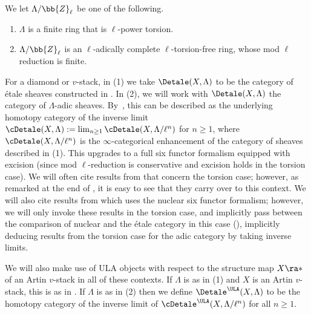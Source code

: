 \documentclass[letterpaper,11pt]{amsart}
\begin{document}
\begin{itemize}
\begin{setup}{\label{assumption: coefficientsystemsingeneral}}
We let $\Lambda/\bb{Z}_{\ell}$ be one of the following.
\begin{enumerate}
\item $\Lambda$ is a finite ring that is $\ell$-power torsion.
\item  $\Lambda/\bb{Z}_{\ell}$ is an $\ell$-adically complete $\ell$-torsion-free ring, whose mod $\ell$ reduction is finite.
\end{enumerate}
\end{setup}
For a diamond or $v$-stack, in (1) we take $\Detale(X,\Lambda)$ to be the category of \'etale sheaves constructed in \cite{Ecod}. In (2), we will work with $\Detale(X,\Lambda)$ the category of $\Lambda$-adic sheaves.  By~\cite[Proposition~26.2]{Ecod}, this can be described as the underlying homotopy category of the inverse limit $\cDetale(X,\Lambda) := \lim_{n \geq 1} \cDetale(X,\Lambda/\ell^{n})$ for $n \geq 1$, where $\cDetale(X,\Lambda/\ell^{n})$ is the $\infty$-categorical enhancement of the category of sheaves described in (1). This upgrades to a full six functor formalism equipped with excision (since mod $\ell$-reduction is conservative and excision holds in the torsion case). We will often cite results from \cite{Ecod} that concern the torsion case; however, as remarked at the end of \cite[Section~26]{Ecod}, it is easy to see that they carry over to this context. We will also cite results from \cite{Mann2022NuclearSheaves} which uses the nuclear six functor formalism; however, we will only invoke these results in the torsion case, and implicitly pass between the comparison of nuclear and the \'etale category in this case (\cite[Proposition~3.20]{Mann2022NuclearSheaves}), implicitly deducing results from the torsion case for the adic category by taking inverse limits.

We will also make use of ULA objects with respect to the structure map $X \ra \ast$ of an Artin $v$-stack in all of these contexts. If $\Lambda$ is as in (1) and $X$ is an Artin $v$-stack, this is as in \cite[Definition IV.2.31]{FSGeomLLC}. If $\Lambda$ is as in (2) then we define $\Detale^{\ULA}(X,\Lambda)$ to be the homotopy category of the inverse limit of $\cDetale^{\ULA}(X,\Lambda/\ell^{n})$ for all $n \geq 1$. 



\end{itemize}
\end{document}
